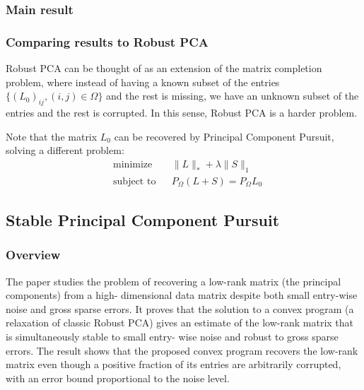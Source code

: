 \documentclass{../common/projectreport}
\begin{document}
\subsubsection{Main result}




\subsubsection{Comparing results to Robust PCA}
Robust PCA can be thought of as an extension of the matrix completion problem, where instead of having a known subset of the entries $\{(L_0)_{ij}, (i,j)\in \Omega\}$ and the rest is missing, we have an unknown subset of the entries and the rest is corrupted. In this sense, Robust PCA is a harder problem.

Note that the matrix $L_0$ can be recovered by Principal Component Pursuit, solving a different problem:
\begin{equation}
\begin{aligned}
&\text{minimize} && \|L\|_* + \lambda \|S\|_1\\
&\text{subject to} && P_\Omega (L+S) = P_\Omega L_0
\end{aligned}
\end{equation}





\subsection{Stable Principal Component Pursuit}
\subsubsection{Overview}

The paper studies the problem of recovering a low-rank matrix (the principal components) from a high- dimensional data matrix despite both small entry-wise noise and gross sparse errors. It proves that the solution to a convex program (a relaxation of classic Robust PCA) gives an estimate of the low-rank matrix that is simultaneously stable to small entry- wise noise and robust to gross sparse errors. The result shows that the proposed convex program recovers the low-rank matrix even though a positive fraction of its entries are arbitrarily corrupted, with an error bound proportional to the noise level. 
\end{document}
